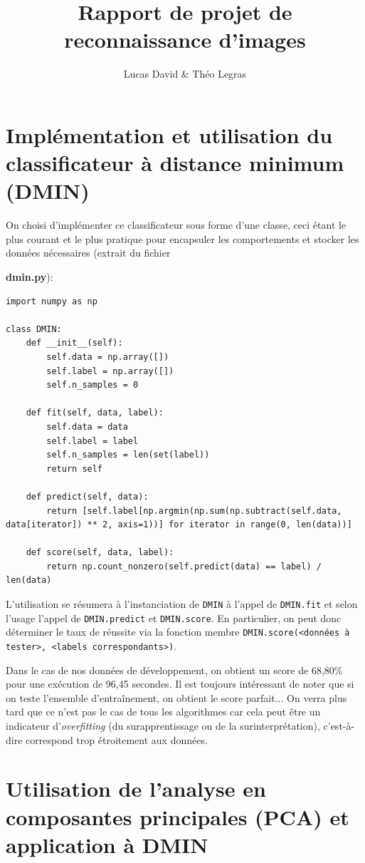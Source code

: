 \documentclass[12pt,a4paper]{article}
\author{Lucas David \& Théo Legras}
\title{Rapport de projet de reconnaissance d'images}
\date{}
\begin{document}
\maketitle

\section{Implémentation et utilisation du classificateur à distance minimum (DMIN)}

On choisi d'implémenter ce classificateur sous forme d'une classe, ceci étant le plus courant et le plus pratique pour encapsuler les comportements et stocker les données nécessaires (extrait du fichier {\textbf{\ttfamily dmin.py}):
\begin{lstlisting}[style=darkula]
import numpy as np

class DMIN:
	def __init__(self):
		self.data = np.array([])
		self.label = np.array([])
		self.n_samples = 0

	def fit(self, data, label):
		self.data = data
		self.label = label
		self.n_samples = len(set(label))
		return self
		
	def predict(self, data):
		return [self.label[np.argmin(np.sum(np.subtract(self.data, data[iterator]) ** 2, axis=1))] for iterator in range(0, len(data))]

	def score(self, data, label):
		return np.count_nonzero(self.predict(data) == label) / len(data)
\end{lstlisting}

L'utilisation se résumera à l'instanciation de \lstinline[style=default]|DMIN| à l'appel de \lstinline[style=default]|DMIN.fit| et selon l'usage l'appel de \lstinline[style=default]|DMIN.predict| et \lstinline[style=default]|DMIN.score|.
En particulier, on peut donc déterminer le taux de réussite via la fonction membre \lstinline[style=default]|DMIN.score(<données à tester>, <labels correspondants>)|.

Dans le cas de nos données de développement, on obtient un score de 68,80\% pour une exécution de 96,45 secondes.
Il est toujours intéressant de noter que si on teste l'ensemble d'entraînement, on obtient le score parfait... On verra plus tard que ce n'est pas le cas de tous les algorithmes car cela peut être un indicateur d'\textit{overfitting} (du surapprentissage ou de la surinterprétation), c'est-à-dire correspond trop étroitement aux données.

\section{Utilisation de l'analyse en composantes principales (PCA) et application à DMIN}

}
\end{document}
